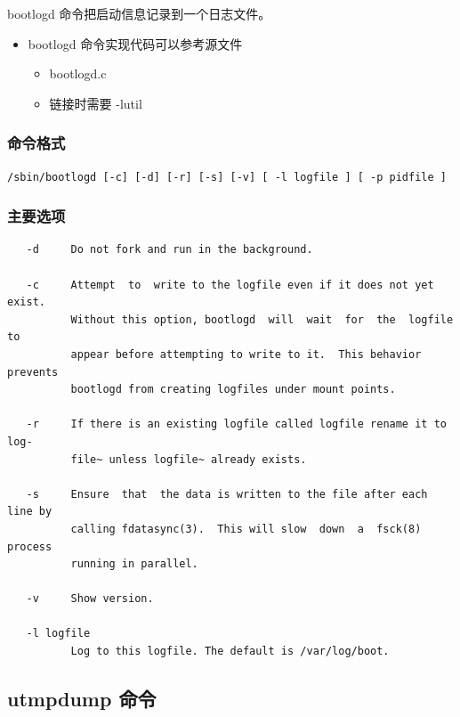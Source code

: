 bootlogd 命令把启动信息记录到一个日志文件。

\begin{itemize}
\item
  bootlogd 命令实现代码可以参考源文件
  \begin{itemize}
  \item
    bootlogd.c
  \item
    链接时需要 -lutil
  \end{itemize}
\end{itemize}
\subsubsection{命令格式}

{\begin{shaded}\begin{verbatim}
/sbin/bootlogd [-c] [-d] [-r] [-s] [-v] [ -l logfile ] [ -p pidfile ]
\end{verbatim}\end{shaded}}
\subsubsection{主要选项}

{\begin{shaded}\begin{verbatim}
   -d     Do not fork and run in the background.

   -c     Attempt  to  write to the logfile even if it does not yet exist.
          Without this option, bootlogd  will  wait  for  the  logfile  to
          appear before attempting to write to it.  This behavior prevents
          bootlogd from creating logfiles under mount points.

   -r     If there is an existing logfile called logfile rename it to log‐
          file~ unless logfile~ already exists.

   -s     Ensure  that  the data is written to the file after each line by
          calling fdatasync(3).  This will slow  down  a  fsck(8)  process
          running in parallel.

   -v     Show version.

   -l logfile
          Log to this logfile. The default is /var/log/boot.
\end{verbatim}\end{shaded}}
\subsection{utmpdump 命令}


